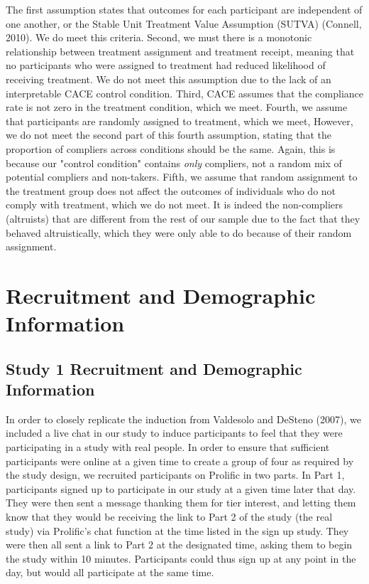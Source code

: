 \documentclass[12pt,]{article}
\begin{document}
The first assumption states that outcomes for each participant are independent of one another, or the Stable Unit Treatment Value Assumption (SUTVA) (Connell, 2010). We do meet this criteria. Second, we must there is a monotonic relationship between treatment assignment and treatment receipt, meaning that no participants who were assigned to treatment had reduced likelihood of receiving treatment. We do not meet this assumption due to the lack of an interpretable CACE control condition. Third, CACE assumes that the compliance rate is not zero in the treatment condition, which we meet. Fourth, we assume that participants are randomly assigned to treatment, which we meet, However, we do not meet the second part of this fourth assumption, stating that the proportion of compliers across conditions should be the same. Again, this is because our "control condition" contains \emph{only} compliers, not a random mix of potential compliers and non-takers. Fifth, we assume that random assignment to the treatment group does not affect the outcomes of individuals who do not comply with treatment, which we do not meet. It is indeed the non-compliers (altruists) that are different from the rest of our sample due to the fact that they behaved altruistically, which they were only able to do because of their random assignment. 


\newpage
\section{Recruitment and Demographic Information}
\label{appendix:recruit}

\subsection{Study 1 Recruitment and Demographic Information}
\label{appendix:recruit_1}

In order to closely replicate the induction from Valdesolo and DeSteno (2007), we included a live chat in our study to induce participants to feel that they were participating in a study with real people. In order to ensure that sufficient participants were online at a given time to create a group of four as required by the study design, we recruited participants on Prolific in two parts. In Part 1, participants signed up to participate in our study at a given time later that day. They were then sent a message thanking them for tier interest, and letting them know that they would be receiving the link to Part 2 of the study (the real study) via Prolific's chat function at the time listed in the sign up study. They were then all sent a link to Part 2 at the designated time, asking them to begin the study within 10 minutes. Participants could thus sign up at any point in the day, but would all participate at the same time. 
\end{document}
